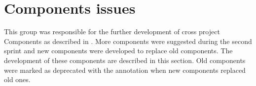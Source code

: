 
\section{\giraf Components issues}

This group was responsible for the further development of cross project \giraf Components as described in . More components were suggested during the second sprint and new components were developed to replace old components. The development of these components are described in this section. Old components were marked as deprecated with the  annotation when new components replaced old ones.  

